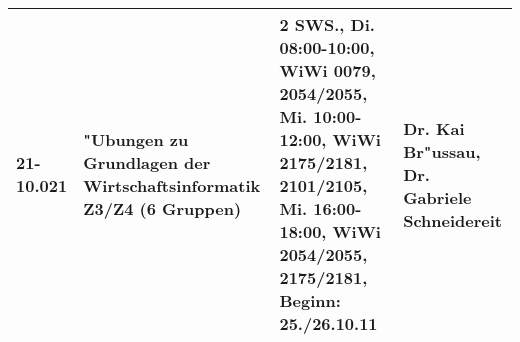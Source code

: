 \begin{tabularx}{\textwidth}{|l|X|X|X|}
\hline 21-10.021 & "Ubungen zu Grundlagen der Wirtschaftsinformatik Z3/Z4 (6 Gruppen)
                 & 2 SWS., Di. 08:00-10:00, WiWi 0079, 2054/2055, Mi. 10:00-12:00, WiWi 2175/2181, 2101/2105, Mi. 16:00-18:00, WiWi 2054/2055, 2175/2181, Beginn: 25./26.10.11
                 & Dr. Kai Br"ussau, Dr. Gabriele Schneidereit \\
                 
%
%
%
\hline
\end{tabularx}

